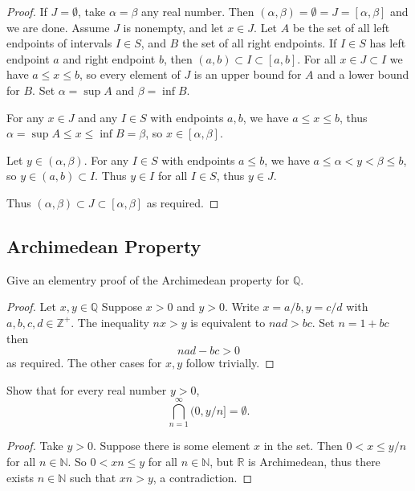 \begin{proof}
    If $J = \emptyset$, take $\alpha = \beta$ any real number.
    Then $(\alpha, \beta) = \emptyset = J = [\alpha, \beta]$ and we are done.
    Assume $J$ is nonempty, and let $x \in J$.
    Let $A$ be the set of all left endpoints of intervals $I \in S$,
        and $B$ the set of all right endpoints.
    If $I \in S$ has left endpoint $a$ and right endpoint $b$,
        then $(a, b) \subset I \subset [a, b]$.
    For all $x \in J \subset I$ we have $a \le x \le b$,
        so every element of $J$ is an upper bound for $A$
        and a lower bound for $B$.
    Set $\alpha = \sup A$ and $\beta = \inf B$.

    For any $x \in J$ and any $I \in S$ with endpoints $a, b$,
        we have $a \le x \le b$,
        thus $\alpha = \sup A \le x \le \inf B = \beta$,
        so $x \in [\alpha, \beta]$.

    Let $y \in (\alpha, \beta)$.
    For any $I \in S$ with endpoints $a \le b$,
        we have $a \le \alpha < y < \beta \le b$,
        so $y \in (a, b) \subset I$.
    Thus $y \in I$ for all $I \in S$, thus $y \in J$.

    Thus $(\alpha, \beta) \subset J \subset [\alpha, \beta]$ as required.
\end{proof}

\subsection{Archimedean Property}

\begin{tcolorbox}[title=Problem 1, breakable]
    Give an elementry proof of the Archimedean property for $\mathbb{Q}$.
\end{tcolorbox}

\begin{proof}
    Let $x, y \in \mathbb{Q}$
    Suppose $x > 0$ and $y > 0$.
    Write $x = a/b, y = c/d$ with $a,b,c,d \in \mathbb{Z}^+$.
    The inequality $nx > y$ is equivalent to $nad > bc$.
    Set $n = 1 + bc$ then 
    \[nad - bc > 0\]
    as required.
    The other cases for $x, y$ follow trivially.
\end{proof}

\begin{tcolorbox}[title=Problem 2, breakable]
    Show that for every real number $y > 0$,
    \[\bigcap_{n = 1}^\infty (0, y/n] = \emptyset.\]
\end{tcolorbox}

\begin{proof}
    Take $y > 0$.
    Suppose there is some element $x$ in the set.
    Then $0 < x \le y/n$ for all $n \in \mathbb{N}$.
    So $0 < xn \le y$ for all $n \in \mathbb{N}$, but $\mathbb{R}$ is Archimedean,
    thus there exists $n \in \mathbb{N}$ such that $xn > y$, a contradiction.
\end{proof}

